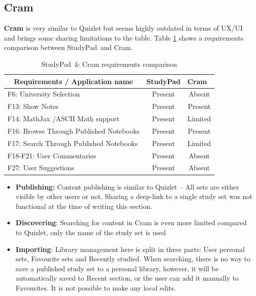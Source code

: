 \documentclass[thesis=B,english]{FITthesis}[2012/10/20]
\newcommand{\appname}{StudyPad}
\begin{document}
\subsection{Cram}
\textbf{Cram} is very similar to Quizlet but seems highly outdated in terms of UX/UI and brings some sharing limitations to the table. Table \ref{tab:cram} shows a requirements comparison between \appname\ and Cram.



\begin{table}[H]
\caption{\appname\ \& Cram requirements comparison}
\label{tab:cram}
\begin{tabular}{|l|c|c|}
\hline
\multicolumn{1}{|c|}{\textbf{Requirements / Application name}} & \multicolumn{1}{l|}{\textbf{StudyPad}} & \multicolumn{1}{l|}{\textbf{Cram}} \\ \hline
F6: University Selection                                       & Present                                & Absent                             \\ \hline
F13: Show Notes                                                & Present                                & Present                            \\ \hline
F14: MathJax /ASCII Math support                               & Present                                & Limited                            \\ \hline
F16: Browse Through Published Notebooks                        & Present                                & Present                            \\ \hline
F17: Search Through Published Notebooks                    & Present                                & Limited                            \\ \hline
F18-F21: User Commentaries                                     & Present                                & Absent                             \\ \hline
F27: User Suggestions                                          & Present                                & Absent                             \\ \hline
\end{tabular}
\end{table}

\begin{itemize}
	\item  \textbf{Publishing:} Content publishing is similar to Quizlet -- All sets are either visible by other users or not. Sharing a deep-link to a single study set was not functional at the time of writing this section.
	\item \textbf{Discovering}: Searching for content in Cram is even more limited compared to Quizlet, only the name of the study set is used
	\item \textbf{Importing}: Library management here is split in three parts: User personal sets, Favourite sets and Recently studied. When searching, there is no way to save a published study set to a personal library, however, it will be automatically saved to Recent section, or the user can add it manually to Favourites. It is not possible to make any local edits.
\end{itemize}
\end{document}
